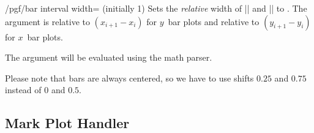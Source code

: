 \label{key-bar-interval-width}%
\begin{key}{/pgf/bar interval width= (initially 1)}
	Sets the \emph{relative} width of |\pgfplothandlerxbarinterval| and |\pgfplothandlerybarinterval| to . The argument is relative to $(x_{i+1} - x_i)$ for $y$~bar plots and relative to $(y_{i+1}-y_i)$ for $x$~bar plots.
	
	The argument  will be evaluated using the math parser.
\begin{codeexample}[]
\end{codeexample}
Please note that bars are always centered, so we have to use shifts $0.25$ and $0.75$ instead of $0$ and $0.5$.
\end{key}

\subsection{Mark Plot Handler}

\label{section-plot-marks}

